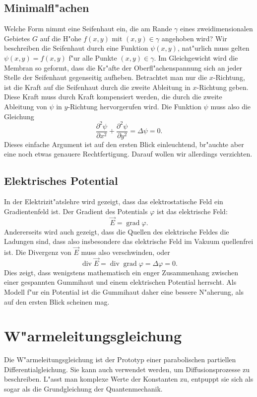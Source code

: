 \subsection{Minimalfl"achen}
Welche Form nimmt eine Seifenhaut ein, die am Rande $\gamma$ eines
zweidimensionalen Gebietes $G$ auf die H"ohe $f(x,y)$ mit $(x,y)\in \gamma$
angehoben wird? Wir beschreiben die Seifenhaut durch eine Funktion
$\psi(x,y)$, nat"urlich muss gelten $\psi(x,y)=f(x,y)$ f"ur alle
Punkte $(x,y)\in\gamma$.
Im Gleichgewicht wird die Membran so geformt, dass die Kr"afte
der Oberfl"achenspannung sich an jeder Stelle der Seifenhaut gegenseitig
aufheben. Betrachtet man nur die $x$-Richtung, ist die Kraft auf die
Seifenhaut durch die zweite Ableitung in $x$-Richtung geben.
Diese Kraft muss durch Kraft kompensiert werden, die durch die
zweite Ableitung von $\psi$ in $y$-Richtung hervorgerufen wird.
Die Funktion $\psi$ muss also die Gleichung
\[
\frac{\partial^2\psi}{\partial x^2}+\frac{\partial^2\psi}{\partial y^2}
=\Delta\psi=0.
\]
Dieses einfache Argument ist auf den ersten Blick einleuchtend, br"auchte
aber eine noch etwas genauere Rechtfertigung. Darauf wollen wir allerdings
verzichten.

\subsection{Elektrisches Potential}
In der Elektrizit"atslehre wird gezeigt, dass das elektrostatische Feld 
ein Gradientenfeld ist. Der Gradient des Potentials $\varphi$  ist das
elektrische Feld:
\[
\vec E=\operatorname{grad}\varphi.
\]
Andererseits wird auch gezeigt, dass die Quellen des elektrische Feldes die
Ladungen sind, dass also insbesondere das elektrische Feld im Vakuum quellenfrei ist.
Die Divergenz von $\vec E$ muss also verschwinden, oder
\[
\operatorname{div}\vec E=\operatorname{div}\operatorname{grad}\varphi
=\Delta \varphi=0.
\]
Dies zeigt, dass wenigstens mathematisch ein enger Zusammenhang zwischen
einer gespannten Gummihaut und einem elektrischen Potential herrscht.
Als Modell f"ur ein Potential ist die Gummihaut daher eine bessere
N"aherung, als auf den ersten Blick scheinen mag.

\section{W"armeleitungsgleichung}
Die W"armeleitungsgleichung ist der Prototyp einer parabolischen partiellen
Differentialgleichung. Sie kann auch verwendet werden, um Diffusionsprozesse
zu beschreiben. L"asst man komplexe Werte der Konstanten zu, entpuppt
sie sich als sogar als die Grundgleichung der Quantenmechanik.

